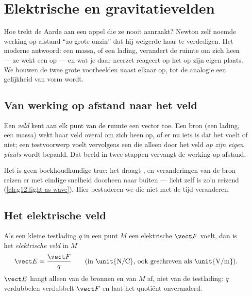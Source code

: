 \chapter{Elektrische en gravitatievelden}\label{ch:g11:electric-gravitational-fields}

Hoe trekt de Aarde aan een appel die ze nooit aanraakt? Newton zelf noemde
werking op afstand ``zo grote onzin'' dat hij weigerde haar te
verdedigen. Het moderne antwoord: een massa, of een lading, verandert de
ruimte om zich heen --- ze wekt een \emph{} op --- en wat je daar
neerzet reageert op het  op zijn eigen plaats. We bouwen de twee
grote voorbeelden naast elkaar op, tot de analogie een gelijkheid van
vorm wordt.

\section{Van werking op afstand naar het veld}

\begin{definition}[Veld]\label{def:g11:electric-gravitational-fields:field}
Een \emph{veld} kent aan elk punt van de ruimte een vector
toe. Een bron (een lading, een massa) wekt haar veld overal om zich heen
op, of er nu iets is dat het voelt of niet; een testvoorwerp voelt
vervolgens een  die alleen door het veld \emph{op zijn eigen
plaats} wordt bepaald. Dat beeld in twee stappen vervangt de werking op
afstand.
\end{definition}

\begin{remark}
Het  is geen boekhoudkundige truc: het draagt , en
veranderingen van de bron reizen er met eindige snelheid doorheen naar
buiten --- licht zelf is zo'n reizend 
(\cref{ch:g12:light-as-wave}). Hier bestuderen we  die niet met de
tijd veranderen.
\end{remark}

\section{Het elektrische veld}

\begin{definition}\label{def:g11:electric-gravitational-fields:efield}
Als een kleine testlading $q$ in een punt $M$ een elektrische 
$\vect F$ voelt, dan is het \emph{elektrische veld}
in $M$
\[
\vect E = \frac{\vect F}{q}
\qquad \text{(in \unit{N/C}, ook geschreven als \unit{V/m})}.
\]
$\vect E$ hangt alleen van de bronnen en van $M$ af, niet van de
testlading: $q$ verdubbelen verdubbelt $\vect F$ en laat het quotiënt
onveranderd.
\end{definition}

